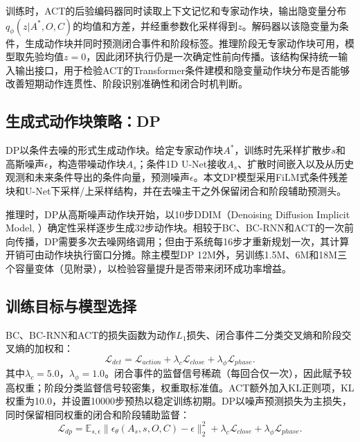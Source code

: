 训练时，ACT的后验编码器同时读取上下文记忆和专家动作块，输出隐变量分布$q_\phi(z|A^\ast,O,C)$的均值和方差，并经重参数化采样得到$z$。解码器以该隐变量为条件，生成动作块并同时预测闭合事件和阶段标签。推理阶段无专家动作块可用，模型取先验均值$z=0$，因此闭环执行仍是一次确定性前向传播。该结构保持统一输入输出接口，用于检验ACT的Transformer条件建模和隐变量动作块分布是否能够改善短期动作连贯性、阶段识别准确性和闭合时机判断。

\subsection{生成式动作块策略：DP}

DP以条件去噪的形式生成动作块\citep{ho2020denoising,song2021denoising,chi2023diffusion}。给定专家动作块$A^\ast$，训练时先采样扩散步$s$和高斯噪声$\epsilon$，构造带噪动作块$A_s$；条件1D U-Net\citep{ronneberger2015unet}接收$A_s$、扩散时间嵌入以及从历史观测和未来条件导出的条件向量，预测噪声$\epsilon$。本文DP模型采用FiLM式条件残差块和U-Net下采样/上采样结构，并在去噪主干之外保留闭合和阶段辅助预测头。

推理时，DP从高斯噪声动作块开始，以10步DDIM（Denoising Diffusion Implicit Model, \citep{song2021denoising}）确定性采样逐步生成32步动作块。相较于BC、BC-RNN和ACT的一次前向传播，DP需要多次去噪网络调用；但由于系统每16步才重新规划一次，其计算开销可由动作块执行窗口分摊。除主模型DP 12M外，另训练1.5M、6M和18M三个容量变体（见附录），以检验容量提升是否带来闭环成功率增益。

\subsection{训练目标与模型选择}

BC、BC-RNN和ACT的损失函数为动作$L_1$损失、闭合事件二分类交叉熵和阶段交叉熵的加权和：
\begin{equation}
    \mathcal{L}_{det}
    = \mathcal{L}_{action}
    + \lambda_c \mathcal{L}_{close}
    + \lambda_\phi \mathcal{L}_{phase}.
    \label{eq:deterministic-policy-loss}
\end{equation}
其中$\lambda_c=5.0$，$\lambda_\phi=1.0$。闭合事件的监督信号稀疏（每回合仅一次），因此赋予较高权重；阶段分类监督信号较密集，权重取标准值。ACT额外加入KL正则项，KL权重为10.0，并设置10000步预热以稳定训练初期。DP以噪声预测损失为主损失，同时保留相同权重的闭合和阶段辅助监督：
\begin{equation}
    \mathcal{L}_{dp}
    = \mathbb{E}_{s,\epsilon}\|\epsilon_\theta(A_s,s,O,C)-\epsilon\|_2^2
    + \lambda_c \mathcal{L}_{close}
    + \lambda_\phi \mathcal{L}_{phase}.
    \label{eq:diffusion-policy-loss}
\end{equation}

